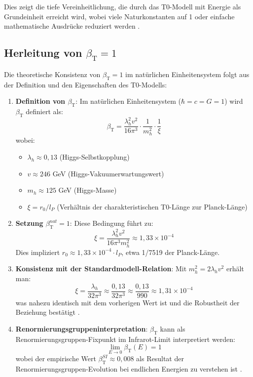 \documentclass[12pt,a4paper]{article}
\newcommand{\betaT}{\beta_{\text{T}}}
\begin{document}
	Dies zeigt die tiefe Vereinheitlichung, die durch das T0-Modell mit Energie als Grundeinheit erreicht wird, wobei viele Naturkonstanten auf 1 oder einfache mathematische Ausdrücke reduziert werden \cite{pascher_params_2025}.
	
	\subsection{Herleitung von $\betaT = 1$}
	
	Die theoretische Konsistenz von $\betaT = 1$ im natürlichen Einheitensystem folgt aus der Definition und den Eigenschaften des T0-Modells:
	
	\begin{enumerate}
		\item \textbf{Definition von $\betaT$}: Im natürlichen Einheitensystem ($\hbar = c = G = 1$) wird $\betaT$ definiert als:
		\begin{equation}
			\betaT = \frac{\lambda_h^2 v^2}{16\pi^3} \cdot \frac{1}{m_h^2} \cdot \frac{1}{\xi}
		\end{equation}
		wobei:
		\begin{itemize}
			\item $\lambda_h \approx 0,13$ (Higgs-Selbstkopplung)
			\item $v \approx 246$ GeV (Higgs-Vakuumerwartungswert)
			\item $m_h \approx 125$ GeV (Higgs-Masse)
			\item $\xi = r_0/l_P$ (Verhältnis der charakteristischen T0-Länge zur Planck-Länge)
		\end{itemize}
		
		\item \textbf{Setzung $\betaT^{nat} = 1$}: Diese Bedingung führt zu:
		\begin{equation}
			\xi = \frac{\lambda_h^2 v^2}{16\pi^3 m_h^2} \approx 1,33 \times 10^{-4}
		\end{equation}
		Dies impliziert $r_0 \approx 1,33 \times 10^{-4} \cdot l_P$, etwa 1/7519 der Planck-Länge.
		
		\item \textbf{Konsistenz mit der Standardmodell-Relation}: Mit $m_h^2 = 2\lambda_h v^2$ erhält man:
		\begin{equation}
			\xi = \frac{\lambda_h}{32\pi^3} \approx \frac{0,13}{32\pi^3} \approx \frac{0,13}{990} \approx 1,31 \times 10^{-4}
		\end{equation}
		was nahezu identisch mit dem vorherigen Wert ist und die Robustheit der Beziehung bestätigt \cite{pascher_alphabeta_2025}.
		
		\item \textbf{Renormierungsgruppeninterpretation}: $\betaT$ kann als Renormierungsgruppen-Fixpunkt im Infrarot-Limit interpretiert werden:
		\begin{equation}
			\lim_{E \to 0} \betaT(E) = 1
		\end{equation}
		wobei der empirische Wert $\betaT^{SI} \approx 0,008$ als Resultat der Renormierungsgruppen-Evolution bei endlichen Energien zu verstehen ist \cite{pascher_alphabeta_2025}.
	\end{enumerate}
	
\end{document}

